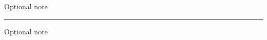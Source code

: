 

\setcounter{page}{0}
\thispagestyle{fancy-blank}
\begingroup
{\large Optional note\par}
\vspace*{35mm}
{\huge\bfseries\utitle\par}

\vspace*{5mm}
{\Large\usubtitle\par}

\vspace*{4mm}
{\rule{\linewidth}{0.5mm}\par}
\vspace*{4mm}

{\large\bfseries\uauthor\par}\vspace*{1mm}

{\large\itshape\uaffiliation\newline}
{\large\itshape\udate\newline}

\vfill
{\large Optional note\par}
\endgroup
\clearpage
